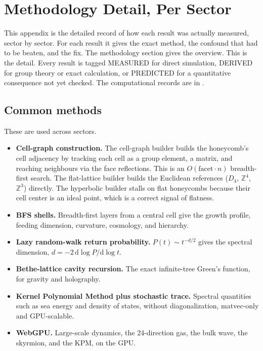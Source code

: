 \section{Methodology Detail, Per Sector}

This appendix is the detailed record of how each result was actually measured, sector by sector. For each result
it gives the exact method, the confound that had to be beaten, and the fix. The methodology section gives the
overview. This is the detail. Every result is tagged MEASURED for direct simulation, DERIVED for group theory or
exact calculation, or PREDICTED for a quantitative consequence not yet checked. The computational records are in
\cite{pollard2026vibetest}.

\subsection{Common methods}

These are used across sectors.

\begin{itemize}
  \item \textbf{Cell-graph construction.} The cell-graph builder builds the honeycomb's cell
  adjacency by tracking each cell as a group element, a matrix, and reaching neighbours via the face reflections.
  This is an $O(\mathrm{facet} \cdot n)$ breadth-first search. The flat-lattice builder
  builds the Euclidean references ($D_4$, $\mathbb{Z}^4$, $\mathbb{Z}^3$) directly. The hyperbolic builder stalls
  on flat honeycombs because their cell center is an ideal point, which is a correct signal of flatness.
  \item \textbf{BFS shells.} Breadth-first layers from a central cell give the growth profile, feeding dimension,
  curvature, cosmology, and hierarchy.
  \item \textbf{Lazy random-walk return probability.} $P(t) \sim t^{-d/2}$ gives the spectral dimension,
  $d = -2\, \mathrm{d}\log P / \mathrm{d}\log t$.
  \item \textbf{Bethe-lattice cavity recursion.} The exact infinite-tree Green's function, for gravity and
  holography.
  \item \textbf{Kernel Polynomial Method plus stochastic trace.} Spectral quantities such as sea energy and
  density of states, without diagonalization, matvec-only and GPU-scalable.
  \item \textbf{WebGPU.} Large-scale dynamics, the 24-direction gas, the bulk wave, the skyrmion, and the KPM, on
  the GPU.
\end{itemize}

